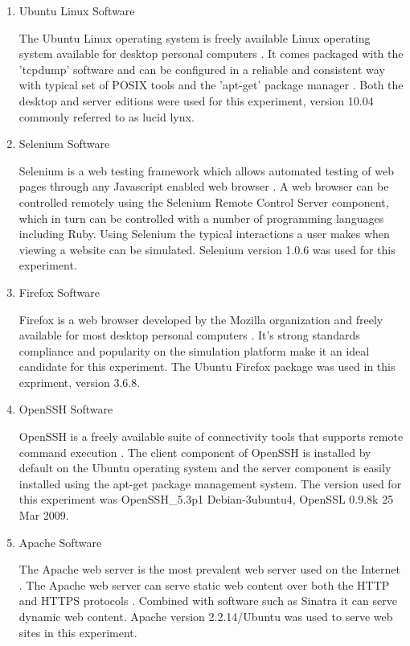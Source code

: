 \begin{enumerate}
  \item Ubuntu Linux Software

  The Ubuntu Linux operating system is freely available Linux operating system
  available for desktop personal computers \parencite{:2010ly}. It comes
  packaged with the 'tcpdump' software and can be configured in a reliable and
  consistent way with typical set of POSIX tools and the 'apt-get' package
  manager \parencite{Pereira:2011uq}. Both the desktop and server editions were
  used for this experiment, version 10.04 commonly referred to as lucid lynx.

  \item Selenium Software

  Selenium is a web testing framework which allows automated testing of web pages
  through any Javascript enabled web browser \parencite{:2010ys}. A web browser
  can be controlled remotely using the Selenium Remote Control Server component,
  which in turn can be controlled with a number of programming languages including
  Ruby. Using Selenium the typical interactions a user makes when viewing a
  website can be simulated. Selenium version 1.0.6 was used for this experiment.

  \item Firefox Software

  Firefox is a web browser developed by the Mozilla organization and freely
  available for most desktop personal computers \parencite{Foundation:2011fk}.
  It's strong standards compliance \parencite{Hammond:2010fk} and popularity
  \parencite{:2010kx,:2010vn} on the simulation platform make it an ideal
  candidate for this experiment. The Ubuntu Firefox package was used in this
  expriment, version 3.6.8.

  \item OpenSSH Software

  OpenSSH is a freely available suite of connectivity tools
  \parencite{:2010zr,:ve} that supports remote command execution
  \parencite{Tucker:2010ly}. The client component of OpenSSH is installed by
  default on the Ubuntu operating system and the server component is easily
  installed using the apt-get package management system. The version used for
  this experiment was OpenSSH\_5.3p1 Debian-3ubuntu4, OpenSSL 0.9.8k 25 Mar 2009.

  \item Apache Software

  The Apache web server is the most prevalent web server used on the Internet
  \parencite{2010:dq}. The Apache web server can serve static web content over
  both the HTTP and HTTPS protocols \parencite{Foundation:2011uq}. Combined with
  software such as Sinatra it can serve dynamic web content. Apache version
  2.2.14/Ubuntu was used to serve web sites in this experiment.


\end{enumerate}
